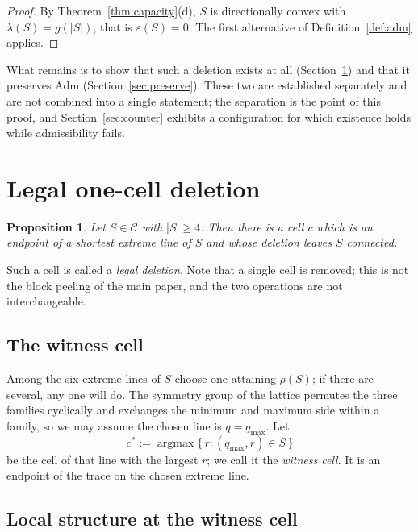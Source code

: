 \documentclass[11pt]{article}
\theoremstyle{plain}
\newtheorem{proposition}[theorem]{Proposition}
\theoremstyle{definition}
\theoremstyle{remark}
\newcommand{\Adm}{\mathrm{Adm}}
\begin{document}
\begin{proof}
By Theorem~\ref{thm:capacity}(d), \(S\) is directionally convex with
\(\lambda(S)=g(|S|)\), that is \(\varepsilon(S)=0\). The first alternative of
Definition~\ref{def:adm} applies.
\end{proof}

What remains is to show that such a deletion exists at all
(Section~\ref{sec:legal}) and that it preserves \(\Adm\) (Section~\ref{sec:preserve}).
These two are established separately and are not combined into a single statement; the
separation is the point of this proof, and Section~\ref{sec:counter} exhibits a configuration for which
existence holds while admissibility fails.

\section{Legal one-cell deletion}\label{sec:legal}

\begin{proposition}\label{pro:legal}
Let \(S\in\mathcal{C}\) with \(|S|\ge4\). Then there is a cell \(c\) which is an endpoint of
a shortest extreme line of \(S\) and whose deletion leaves \(S\) connected.
\end{proposition}

Such a cell is called a \emph{legal deletion}. Note that a single cell is removed; this is
not the block peeling of the main paper, and the two operations are not interchangeable.

\subsection{The witness cell}\label{sec:11.1}

Among the six extreme lines of \(S\) choose one attaining \(\rho(S)\); if there are several,
any one will do. The symmetry group of the lattice permutes the three families cyclically
and exchanges the minimum and maximum side within a family, so we may assume the chosen line
is \(q=q_{\max}\). Let
\[
   c^{*}:=\operatorname*{argmax}\{\,r:(q_{\max},r)\in S\,\}
\]
be the cell of that line with the largest \(r\); we call it the \emph{witness cell}. It is
an endpoint of the trace on the chosen extreme line.

\subsection{Local structure at the witness cell}\label{sec:11.2}
\end{document}
